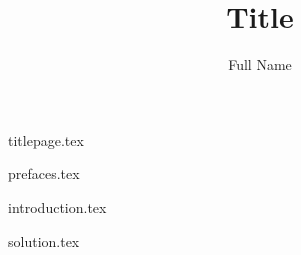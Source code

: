 \documentclass[
    a4paper,
    12pt
]{report}
\title{Title}
\author{Full Name}
\date{}
\begin{document}
{titlepage.tex}

{prefaces.tex}

{introduction.tex}

{solution.tex}
\end{document}
